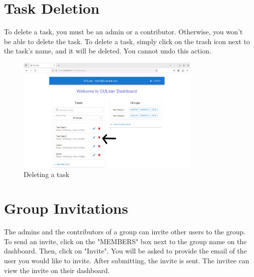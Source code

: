 \documentclass{scrreprt}
\begin{document}
\chapter{Task Deletion}

To delete a task, you must be an admin or a contributor. Otherwise, you won't be able to delete the task. To delete a task, simply click on the trash icon next to the task's name, and it will be deleted. You cannot undo this action.

\begin{figure}[htbp]
        \centering
	\includegraphics[width=0.8\textwidth]{delete_task.png}
	\caption{Deleting a task}
	\label{fig:my_label}
\end{figure}


\chapter{Group Invitations}

The admins and the contributors of a group can invite other users to the group. To send an invite, click on the "MEMBERS" box next to the group name on the dashboard. Then, click on "Invite". You will be asked to provide the email of the user you would like to invite. After submitting, the invite is sent. The invitee can view the invite on their dashboard.\\
\end{document}
